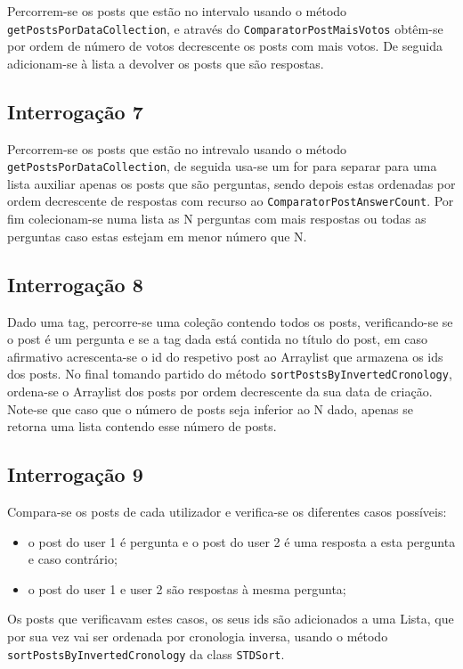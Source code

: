 \documentclass[11pt,a4paper]{article}
\begin{document}
Percorrem-se os posts que estão no intervalo usando o método \texttt{getPostsPorDataCollection}, e através do \texttt{ComparatorPostMaisVotos} obtêm-se por ordem de número de votos decrescente os posts com mais votos. De seguida adicionam-se à lista a devolver os posts que são respostas.

\subsection{Interrogação 7}

Percorrem-se os posts que estão no intrevalo usando o método \texttt{getPostsPorDataCollection}, de seguida usa-se um for para separar para uma lista auxiliar apenas os posts que são perguntas, sendo depois estas ordenadas por ordem decrescente de respostas com recurso ao \texttt{ComparatorPostAnswerCount}. Por fim colecionam-se numa lista as N perguntas com mais respostas ou todas as perguntas caso estas estejam em menor número que N.

\subsection{Interrogação 8}

Dado uma tag, percorre-se uma coleção contendo todos os posts, verificando-se se o post é um pergunta e se a tag dada está contida no título do post, em caso afirmativo acrescenta-se o id do respetivo post ao Arraylist que armazena os ids dos posts. No final tomando partido do método \texttt{sortPostsByInvertedCronology}, ordena-se o Arraylist dos posts por ordem decrescente da sua data de criação. Note-se que caso que o número de posts seja inferior ao N dado, apenas se retorna uma lista contendo esse número de posts.

\subsection{Interrogação 9}

Compara-se os posts de cada utilizador e verifica-se os diferentes casos possíveis:

\begin{itemize}
    \item o post do user 1 é pergunta e o post do user 2 é uma resposta a esta pergunta e caso contrário;
    \item o post do user 1 e user 2 são respostas à mesma pergunta;
\end{itemize}
Os posts que verificavam estes casos, os seus ids são adicionados a uma Lista, que por sua vez vai ser ordenada por cronologia inversa, usando o método \texttt{sortPostsByInvertedCronology} da class \texttt{STDSort}.
\end{document}
